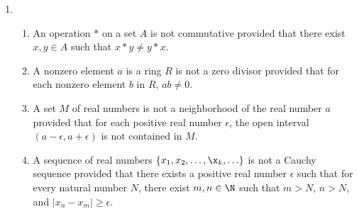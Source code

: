 \begin{enumerate}
\item \begin{enumerate}
\item  An operation $*$ on a set $A$ is not commutative provided that there exist $x, y \in A$ such that 
$x*y \ne y*x$.
\item  A nonzero element $a$ is a ring $R$ is not a zero divisor provided that for each nonzero element $b$ in $R$, $ab \ne 0$.
\item A set $M$ of real numbers is not a neighborhood of the real number $a$ provided that for each positive real number $\epsilon$, the open interval $(a - \epsilon, a + \epsilon)$ is not contained in $M$.
\item A sequence of real numbers $\{x_1, x_2, \ldots, \x_k, \ldots \}$ is not a Cauchy sequence provided that there exists a positive real number $\epsilon$ such that for every natural number $N$, there exist $m,n \in \N$ such that $m > N$, $n > N$, and $|x_n - x_m | \geq \epsilon$.
\end{enumerate}
\end{enumerate}


